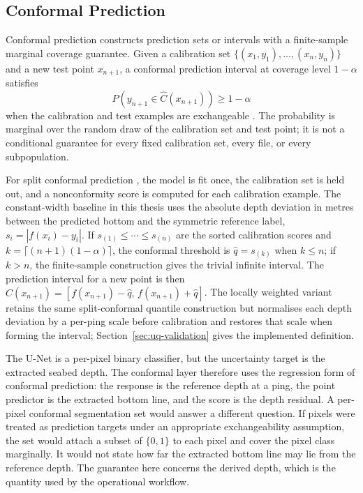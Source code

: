 \subsection{Conformal Prediction}
\label{sec:conformal-theory}

Conformal prediction \cite{shafer_tutorial_2008,angelopoulos_gentle_2023} constructs prediction sets or intervals with a finite-sample marginal coverage guarantee. Given a calibration set $\{(x_1, y_1), \ldots, (x_n, y_n)\}$ and a new test point $x_{n+1}$, a conformal prediction interval at coverage level $1 - \alpha$ satisfies
\begin{equation}
    P\!\left(y_{n+1} \in \hat{C}(x_{n+1})\right) \geq 1 - \alpha
\end{equation}
when the calibration and test examples are exchangeable \cite{shafer_tutorial_2008}. The probability is marginal over the random draw of the calibration set and test point; it is not a conditional guarantee for every fixed calibration set, every file, or every subpopulation.

For split conformal prediction \cite{lei_distributionfree_2018}, the model is fit once, the calibration set is held out, and a nonconformity score is computed for each calibration example. The constant-width baseline in this thesis uses the absolute depth deviation in metres between the predicted bottom and the symmetric reference label, $s_i=|f(x_i)-y_i|$. If $s_{(1)} \leq \cdots \leq s_{(n)}$ are the sorted calibration scores and $k=\lceil (n+1)(1-\alpha) \rceil$, the conformal threshold is $\hat q=s_{(k)}$ when $k \leq n$; if $k>n$, the finite-sample construction gives the trivial infinite interval. The prediction interval for a new point is then $\hat{C}(x_{n+1})=[f(x_{n+1})-\hat q,\,f(x_{n+1})+\hat q]$. The locally weighted variant retains the same split-conformal quantile construction but normalises each depth deviation by a per-ping scale before calibration and restores that scale when forming the interval; Section~\ref{sec:uq-validation} gives the implemented definition.

The U-Net is a per-pixel binary classifier, but the uncertainty target is the extracted seabed depth. The conformal layer therefore uses the regression form of conformal prediction: the response is the reference depth at a ping, the point predictor is the extracted bottom line, and the score is the depth residual. A per-pixel conformal segmentation set would answer a different question. If pixels were treated as prediction targets under an appropriate exchangeability assumption, the set would attach a subset of $\{0,1\}$ to each pixel and cover the pixel class marginally. It would not state how far the extracted bottom line may lie from the reference depth. The guarantee here concerns the derived depth, which is the quantity used by the operational workflow.


